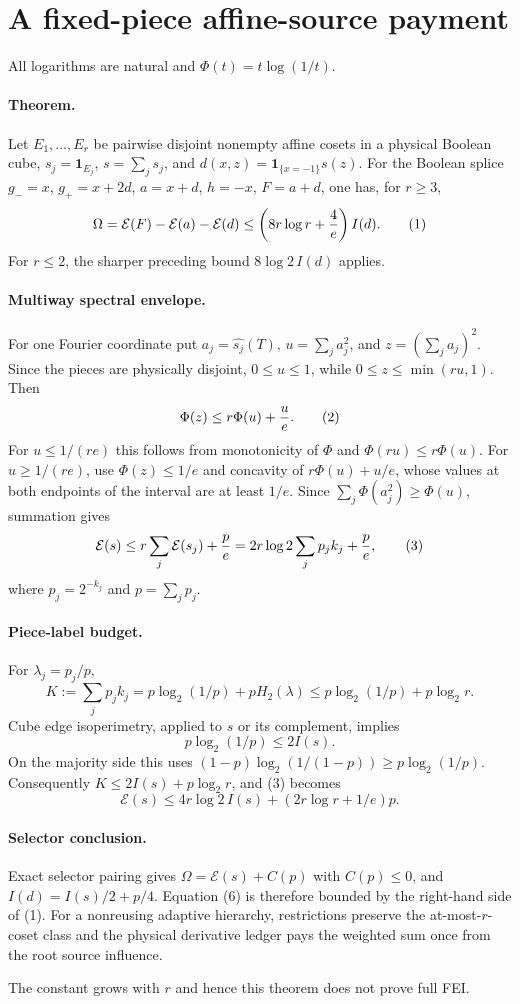 \section*{A fixed-piece affine-source payment}
All logarithms are natural and $\Phi(t)=t\log(1/t)$.

\paragraph{Theorem.}
Let $E_1,\ldots,E_r$ be pairwise disjoint nonempty affine cosets in a
physical Boolean cube, $s_j=\mathbf1_{E_j}$, $s=\sum_js_j$, and
$d(x,z)=\mathbf1_{\{x=-1\}}s(z)$.  For the Boolean splice
$g_-=x$, $g_+=x+2d$, $a=x+d$, $h=-x$, $F=a+d$, one has, for $r\ge3$,
\[
 \Omega=\mathcal E(F)-\mathcal E(a)-\mathcal E(d)
 \le\left(8r\log r+{4\over e}\right)I(d).                 \tag{1}
\]
For $r\le2$, the sharper preceding bound $8\log2\,I(d)$ applies.

\paragraph{Multiway spectral envelope.}
For one Fourier coordinate put $a_j=\widehat{s_j}(T)$,
$u=\sum_ja_j^2$, and $z=(\sum_ja_j)^2$.  Since the pieces are physically
disjoint, $0\le u\le1$, while $0\le z\le\min(ru,1)$.  Then
\[
 \Phi(z)\le r\Phi(u)+{u\over e}.                           \tag{2}
\]
For $u\le1/(re)$ this follows from monotonicity of $\Phi$ and
$\Phi(ru)\le r\Phi(u)$.  For $u\ge1/(re)$, use $\Phi(z)\le1/e$ and
concavity of $r\Phi(u)+u/e$, whose values at both endpoints of the
interval are at least $1/e$.  Since
$\sum_j\Phi(a_j^2)\ge\Phi(u)$, summation gives
\[
 \mathcal E(s)\le r\sum_j\mathcal E(s_j)+{p\over e}
 =2r\log2\sum_jp_jk_j+{p\over e},                         \tag{3}
\]
where $p_j=2^{-k_j}$ and $p=\sum_jp_j$.

\paragraph{Piece-label budget.}
For $\lambda_j=p_j/p$,
\[
 K:=\sum_jp_jk_j=p\log_2(1/p)+pH_2(\lambda)
 \le p\log_2(1/p)+p\log_2r.                              \tag{4}
\]
Cube edge isoperimetry, applied to $s$ or its complement, implies
\[
 p\log_2(1/p)\le2I(s).                                    \tag{5}
\]
On the majority side this uses
$(1-p)\log_2(1/(1-p))\ge p\log_2(1/p)$.
Consequently $K\le2I(s)+p\log_2r$, and (3) becomes
\[
 \mathcal E(s)\le4r\log2\,I(s)+(2r\log r+1/e)p.          \tag{6}
\]

\paragraph{Selector conclusion.}
Exact selector pairing gives
$\Omega=\mathcal E(s)+C(p)$ with $C(p)\le0$, and
$I(d)=I(s)/2+p/4$.  Equation (6) is therefore bounded by the right-hand
side of (1).  For a nonreusing adaptive hierarchy, restrictions preserve
the at-most-$r$-coset class and the physical derivative ledger pays the
weighted sum once from the root source influence.

The constant grows with $r$ and hence this theorem does not prove full FEI.
